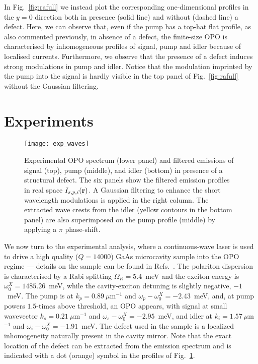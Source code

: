 %
In Fig.~\ref{fig:rafull} we instead plot the corresponding
one-dimensional profiles in the $y=0$ direction both in presence
(solid line) and without (dashed line) a defect. Here, we can observe
that, even if the pump has a top-hat flat profile, as also commented
previously, in absence of a defect, the finite-size OPO is
characterised by inhomogeneous profiles of signal, pump and idler
because of localised currents. Furthermore, we observe that the
presence of a defect induces strong modulations in pump and idler.
%
Notice that the modulation imprinted by the pump into the signal is
hardly visible in the top panel of Fig.~\ref{fig:rafull} without the
Gaussian filtering.


\section{Experiments}
\label{sec:daniele-experiments}

%
\begin{figure}[tb]\centering
  \texttt{[image: exp\_waves]}
  \caption{Experimental OPO spectrum (lower panel) and filtered
    emissions of signal (top), pump (middle), and idler (bottom) in
    presence of a structural defect. The six panels show the filtered
    emission profiles in real space $I_{s, p,i}(\mathbf{r})$. A Gaussian
    filtering to enhance the short wavelength modulations is applied
    in the right column. The extracted wave crests from the idler
    (yellow contours in the bottom panel) are also superimposed on the
    pump profile (middle) by applying a $\pi$ phase-shift.}
\label{fig:exper}
\end{figure}
%
We now turn to the experimental analysis, where a continuous-wave
laser is used to drive a high quality ($Q=14000$) GaAs microcavity
sample into the OPO regime --- details on the sample can be found in
Refs.~\cite{Ballarini_2013,Dominici_2014}.
The polariton dispersion is characterised by a Rabi splitting
$\Omega_R=5.4$~meV and the exciton energy is
$\omega_0^{X}=1485.26$~meV, while the cavity-exciton detuning is
slightly negative, $-1$~meV. The pump is at $k_p=0.89~\mu$m$^{-1}$ and
$\omega_p - \omega_0^{X}=-2.43$~meV, and, at pump powers $1.5$-times
above threshold, an OPO appears, with signal at small wavevector
$k_s=0.21~\mu$m$^{-1}$ and $\omega_s - \omega_0^{X}=-2.95$~meV, and
idler at $k_i=1.57~\mu$m$^{-1}$ and
$\omega_i - \omega_0^{X}=-1.91$~meV.
%
The defect used in the sample is a localized inhomogeneity naturally
present in the cavity mirror. Note that the exact location of the
defect can be extracted from the emission spectrum and is indicated
with a dot (orange) symbol in the profiles of Fig.~\ref{fig:exper}.

